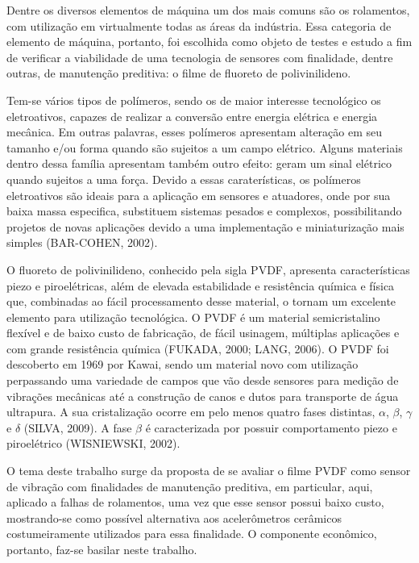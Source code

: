 \documentclass[
	12pt,				
	oneside,			
	a4paper,			
	english,			
	brazil,			
	]{abntex2ppgsi}
\begin{document}
Dentre os diversos elementos de máquina um dos mais comuns são os rolamentos, com utilização em virtualmente todas as áreas da indústria. Essa categoria de elemento de máquina, portanto, foi escolhida como objeto de testes e estudo a fim de verificar a viabilidade de uma tecnologia  de sensores com finalidade, dentre outras, de manutenção preditiva: o filme de fluoreto de polivinilideno. 

Tem-se vários tipos de polímeros, sendo os de maior interesse tecnológico os eletroativos, capazes de realizar a conversão entre energia elétrica e energia mecânica. Em outras palavras, esses polímeros apresentam alteração em seu tamanho e/ou forma quando são sujeitos a um campo elétrico. Alguns  materiais dentro dessa família apresentam também outro efeito: geram um sinal elétrico quando sujeitos a uma força. Devido a essas caraterísticas, os polímeros eletroativos são ideais para a aplicação em sensores e atuadores, onde por sua baixa massa especifica, substituem sistemas pesados e complexos, possibilitando projetos de novas aplicações devido a uma implementação e miniaturização mais simples (BAR-COHEN, 2002).

O fluoreto de polivinilideno, conhecido pela sigla PVDF, apresenta características piezo e piroelétricas, além de elevada estabilidade e resistência química e física que, combinadas ao fácil processamento desse material, o tornam um excelente elemento para utilização tecnológica. O PVDF é um material semicristalino flexível e de baixo custo de fabricação, de fácil usinagem, múltiplas aplicações e com grande resistência química (FUKADA, 2000; LANG, 2006). O PVDF foi descoberto em 1969 por Kawai, sendo um material novo com utilização perpassando uma variedade de campos que vão desde sensores para medição de vibrações mecânicas até a construção de canos e dutos para transporte de água ultrapura. A sua cristalização ocorre em pelo menos quatro fases distintas, $\alpha$, $\beta$, $\gamma$ e $\delta$ (SILVA, 2009). A fase $\beta$ é caracterizada por possuir comportamento piezo e piroelétrico (WISNIEWSKI, 2002).

O tema deste trabalho surge da proposta de se avaliar o filme PVDF como sensor de vibração com finalidades de manutenção preditiva, em particular, aqui, aplicado a falhas de rolamentos, uma vez que esse sensor possui baixo custo, mostrando-se como possível alternativa aos acelerômetros cerâmicos costumeiramente utilizados para essa finalidade. O componente econômico, portanto, faz-se basilar neste trabalho. 
\end{document}

